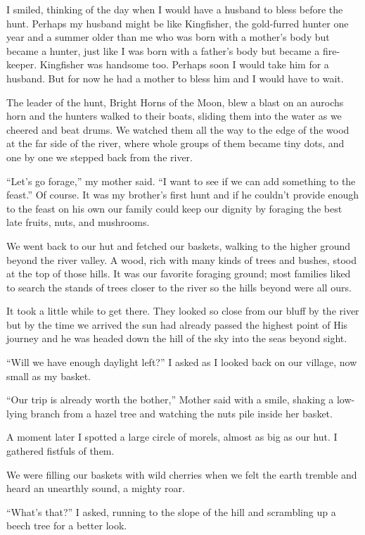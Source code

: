 I smiled, thinking of the day when I would have a husband to bless before the hunt. Perhaps my husband might be like Kingfisher, the gold-furred hunter one year and a summer older than me who was born with a mother's body but became a hunter, just like I was born with a father's body but became a fire-keeper. Kingfisher was handsome too. Perhaps soon I would take him for a husband. But for now he had a mother to bless him and I would have to wait.

The leader of the hunt, Bright Horns of the Moon, blew a blast on an aurochs horn and the hunters walked to their boats, sliding them into the water as we cheered and beat drums. We watched them all the way to the edge of the wood at the far side of the river, where whole groups of them became tiny dots, and one by one we stepped back from the river.

``Let's go forage,'' my mother said. ``I want to see if we can add something to the feast.'' Of course. It was my brother's first hunt and if he couldn't provide enough to the feast on his own our family could keep our dignity by foraging the best late fruits, nuts, and mushrooms.

We went back to our hut and fetched our baskets, walking to the higher ground beyond the river valley. A wood, rich with many kinds of trees and bushes, stood at the top of those hills. It was our favorite foraging ground; most families liked to search the stands of trees closer to the river so the hills beyond were all ours.

It took a little while to get there. They looked so close from our bluff by the river but by the time we arrived the sun had already passed the highest point of His journey and he was headed down the hill of the sky into the seas beyond sight.

``Will we have enough daylight left?'' I asked as I looked back on our village, now small as my basket.

``Our trip is already worth the bother,'' Mother said with a smile, shaking a low-lying branch from a hazel tree and watching the nuts pile inside her basket.

A moment later I spotted a large circle of morels, almost as big as our hut. I gathered fistfuls of them.

We were filling our baskets with wild cherries when we felt the earth tremble and heard an unearthly sound, a mighty roar.

``What's that?'' I asked, running to the slope of the hill and scrambling up a beech tree for a better look.

